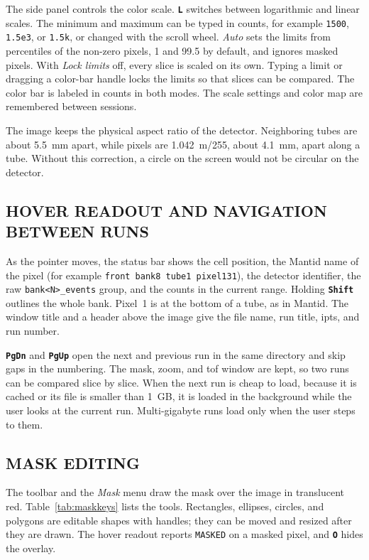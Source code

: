 \documentclass[tm]{ornltm}
\newcommand{\key}[1]{\textbf{\texttt{#1}}}
\begin{document}
The side panel controls the color scale. \key{L} switches between logarithmic
and linear scales. The minimum and maximum can be typed in counts, for example
\texttt{1500}, \texttt{1.5e3}, or \texttt{1.5k}, or changed with the scroll
wheel. \emph{Auto} sets the limits from percentiles of the non-zero pixels,
1 and 99.5 by default, and ignores masked pixels. With \emph{Lock limits} off,
every slice is scaled on its own. Typing a limit or dragging a color-bar handle
locks the limits so that slices can be compared. The color bar is labeled in
counts in both modes. The scale settings and color map are remembered between
sessions.

The image keeps the physical aspect ratio of the detector. Neighboring tubes
are about 5.5~mm apart, while pixels are 1.042~m/255, about 4.1~mm, apart along
a tube. Without this correction, a circle on the screen would not be circular on
the detector.

\subsection{HOVER READOUT AND NAVIGATION BETWEEN RUNS}

As the pointer moves, the status bar shows the cell position, the Mantid name of
the pixel (for example \texttt{front bank8 tube1 pixel131}), the detector
identifier, the raw \texttt{bank<N>\_events} group, and the counts in the
current range. Holding \key{Shift} outlines the whole bank. Pixel~1 is at the
bottom of a tube, as in Mantid. The window title and a header above the image
give the file name, run title, \ac{ipts}, and run number.

\key{PgDn} and \key{PgUp} open the next and previous run in the same directory
and skip gaps in the numbering. The mask, zoom, and \ac{tof} window are kept, so
two runs can be compared slice by slice. When the next run is cheap to load,
because it is cached or its file is smaller than 1~GB, it is loaded in the
background while the user looks at the current run. Multi-gigabyte runs load
only when the user steps to them.

\subsection{MASK EDITING}
\label{sec:mask}

The toolbar and the \emph{Mask} menu draw the mask over the image in
translucent red. Table~\ref{tab:maskkeys} lists the tools. Rectangles,
ellipses, circles, and polygons are editable shapes with handles; they can be
moved and resized after they are drawn. The hover readout reports
\texttt{MASKED} on a masked pixel, and \key{O} hides the overlay.
\end{document}
